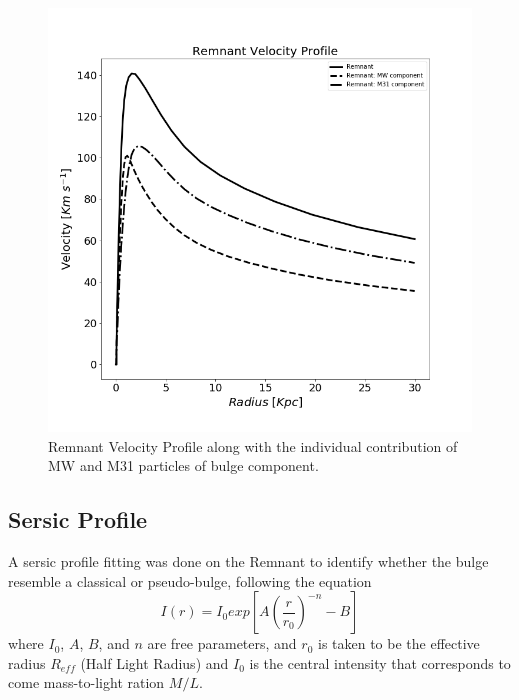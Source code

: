 \documentclass[iop]{emulateapj}
\begin{document}
\begin{figure}[h]
  \centering
  \includegraphics[width=\columnwidth]{RemnantVelProvfile.png}
  \caption{Remnant Velocity Profile along with the individual contribution of MW and M31 particles of bulge component.}
\end{figure}

\subsection{Sersic Profile}
A sersic profile fitting was done on the Remnant to identify whether the bulge resemble a classical or pseudo-bulge, following the equation \begin{equation}
I(r)= I_{0}exp[A(\frac{r}{r_{0}})^{-n}-B]
\end{equation} where $I_{0}$, $A$, $B$, and $n$ are free parameters, and $r_{0}$ is taken to be the effective radius $R_{eff}$ (Half Light Radius) and $I_{0}$ is the central intensity that corresponds to come mass-to-light ration $M/L$. 
\end{document}
